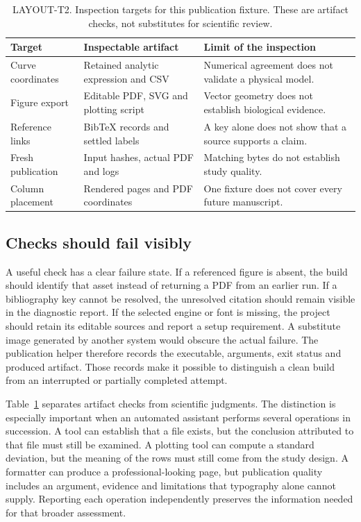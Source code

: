 \begin{table}[!t]
\caption{LAYOUT-T2. Inspection targets for this publication fixture. These are artifact checks, not substitutes for scientific review.}\label{tab:checks}
\centering\small
\begin{tabular}{@{}p{}p{}p{}@{}}\toprule
Target & Inspectable artifact & Limit of the inspection \\ \midrule
Curve coordinates & Retained analytic expression and CSV & Numerical agreement does not validate a physical model. \\
Figure export & Editable PDF, SVG and plotting script & Vector geometry does not establish biological evidence. \\
Reference links & BibTeX records and settled labels & A key alone does not show that a source supports a claim. \\
Fresh publication & Input hashes, actual PDF and logs & Matching bytes do not establish study quality. \\
Column placement & Rendered pages and PDF coordinates & One fixture does not cover every future manuscript. \\ \bottomrule
\end{tabular}
\end{table}

\subsection{Checks should fail visibly}
A useful check has a clear failure state. If a referenced figure is absent, the build should identify that asset instead of returning a PDF from an earlier run. If a bibliography key cannot be resolved, the unresolved citation should remain visible in the diagnostic report. If the selected engine or font is missing, the project should retain its editable sources and report a setup requirement. A substitute image generated by another system would obscure the actual failure. The publication helper therefore records the executable, arguments, exit status and produced artifact. Those records make it possible to distinguish a clean build from an interrupted or partially completed attempt.

Table~\ref{tab:checks} separates artifact checks from scientific judgments. The distinction is especially important when an automated assistant performs several operations in succession. A tool can establish that a file exists, but the conclusion attributed to that file must still be examined. A plotting tool can compute a standard deviation, but the meaning of the rows must still come from the study design. A formatter can produce a professional-looking page, but publication quality includes an argument, evidence and limitations that typography alone cannot supply. Reporting each operation independently preserves the information needed for that broader assessment.

